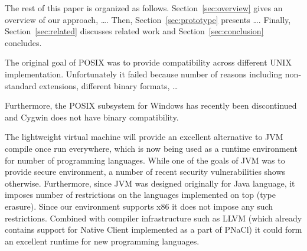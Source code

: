 

The rest of this paper is organized as follows.
Section~\ref{sec:overview} gives an overview of our approach, \ldots.
Then, Section~\ref{sec:prototype} presents \ldots. Finally,
Section~\ref{sec:related} discusses related work and
Section~\ref{sec:conclusion} concludes.




The original goal of POSIX was to provide compatibility across different
UNIX implementation. Unfortunately it failed because number of reasons
including non-standard extensions, different binary formats, \ldots

Furthermore, the POSIX subsystem for Windows has recently been
discontinued and Cygwin does not have binary compatibility. 

The lightweight virtual machine will provide an excellent alternative to
JVM \ie compile once run everywhere, which is now being used as a
runtime environment for number of programming languages.  While one of
the goals of JVM was to provide secure environment, a number of recent
security vulnerabilities shows otherwise. Furthermore, since JVM was
designed originally for Java language, it imposes number of restrictions
on the languages implemented on top (\eg type erasure). Since our
environment supports x86 it does not impose any such restrictions.
Combined with compiler infrastructure such as LLVM (which already
contains support for Native Client implemented as a part of PNaCl) it
could form an excellent runtime for new programming languages.

